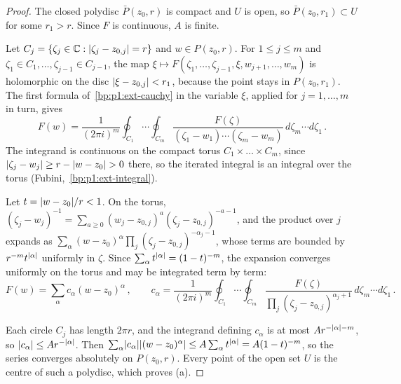 \begin{proof}
\label{step:p1:han-margin}
The closed polydisc $\bar P(z_0,r)$ is compact and $U$ is open, so $\bar P(z_0,r_1)\subset U$ for some
$r_1>r$. Since $F$ is continuous, $A$ is finite.

\label{step:p1:han-cauchy}
Let $C_j=\{\zeta_j\in\mathbb{C}:\lvert \zeta_j-z_{0,j}\rvert=r\}$ and $w\in P(z_0,r)$. For $1\le j\le m$ and
$\zeta_1\in C_1,\dots,\zeta_{j-1}\in C_{j-1}$, the map
$\xi\mapsto F(\zeta_1,\dots,\zeta_{j-1},\xi,w_{j+1},\dots,w_m)$ is holomorphic on the disc
$\lvert \xi-z_{0,j}\rvert<r_1$, because the point stays in $P(z_0,r_1)$. The first formula
of~\ref{bp:p1:ext-cauchy} in the variable $\xi$, applied for $j=1,\dots,m$ in turn, gives
\begin{equation*}
F(w)=\frac1{(2\pi i)^m}\oint_{C_1}\!\!\cdots\oint_{C_m}
\frac{F(\zeta)}{(\zeta_1-w_1)\cdots(\zeta_m-w_m)}\,d\zeta_m\cdots d\zeta_1\,.
\end{equation*}
The integrand is continuous on the compact torus $C_1\times\dots\times C_m$, since
$\lvert \zeta_j-w_j\rvert\ge r-\lvert w-z_0\rvert>0$ there, so the iterated integral is an integral over the torus
(Fubini,~\ref{bp:p1:ext-integral}).

\label{step:p1:han-series}
Let $t=\lvert w-z_0\rvert/r<1$. On the torus,
$(\zeta_j-w_j)^{-1}=\sum_{a\ge0}(w_j-z_{0,j})^a(\zeta_j-z_{0,j})^{-a-1}$, and the product over $j$ expands
as $\sum_\alpha(w-z_0)^\alpha\prod_j(\zeta_j-z_{0,j})^{-\alpha_j-1}$, whose terms are bounded by
$r^{-m}t^{\lvert \alpha\rvert}$ uniformly in $\zeta$. Since $\sum_\alpha t^{\lvert \alpha\rvert}=(1-t)^{-m}$, the expansion
converges uniformly on the torus and may be integrated term by term:
\begin{equation*}
F(w)=\sum_\alpha c_\alpha(w-z_0)^\alpha\,,\qquad
c_\alpha=\frac1{(2\pi i)^m}\oint_{C_1}\!\!\cdots\oint_{C_m}
\frac{F(\zeta)}{\prod_j(\zeta_j-z_{0,j})^{\alpha_j+1}}\,d\zeta_m\cdots d\zeta_1\,.
\end{equation*}

\label{step:p1:han-bounds}
Each circle $C_j$ has length $2\pi r$, and the integrand defining $c_\alpha$ is at most
$Ar^{-\lvert \alpha\rvert-m}$, so $\lvert c_\alpha\rvert\le Ar^{-\lvert \alpha\rvert}$. Then
$\sum_\alpha\lvert c_\alpha\rvert\lvert (w-z_0)^\alpha\rvert\le A\sum_\alpha t^{\lvert \alpha\rvert}=A(1-t)^{-m}$, so the series
converges absolutely on $P(z_0,r)$. Every point of the open set $U$ is the centre of such a polydisc,
which proves (a).


\end{proof}

